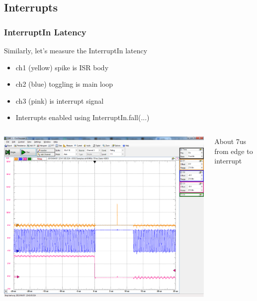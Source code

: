 \documentclass{beamer}
\begin{document}
\subsection{Interrupts}

\begin{frame}[fragile]
\frametitle{InterruptIn Latency}
Similarly, let's measure the InterruptIn latency
{\tiny
\begin{itemize}
  \item ch1 (yellow) spike is ISR body
  \item ch2 (blue) toggling is main loop
  \item ch3 (pink) is interrupt signal
  \item Interrupts enabled using InterruptIn.fall(...)
\end{itemize}}
\begin{columns}[T]
\includegraphics[width=1.0\columnwidth]{images-dis10/irq_interruptin_latency}

About 7us from edge to interrupt \\
\end{columns}
\end{frame}
\end{document}
